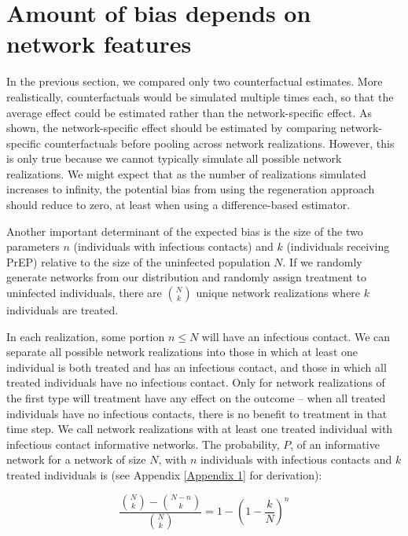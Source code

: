 \documentclass{article}
\theoremstyle{definition}
\begin{document}
\section{Amount of bias depends on network features}
In the previous section, we compared only two counterfactual estimates. More realistically, counterfactuals would be simulated multiple times each, so that the average effect could be estimated rather than the network-specific effect. As shown, the network-specific effect should be estimated by comparing network-specific counterfactuals before pooling across network realizations. However, this is only true because we cannot typically simulate all possible network realizations. We might expect that as the number of realizations simulated increases to infinity, the potential bias from using the regeneration approach should reduce to zero, at least when using a difference-based estimator.

Another important determinant of the expected bias is the size of the two parameters $n$ (individuals with infectious contacts) and $k$ (individuals receiving PrEP) relative to the size of the uninfected population $N$. If we randomly generate networks from our distribution and randomly assign treatment to uninfected individuals, there are $\binom{N}{k}$ unique network realizations where $k$ individuals are treated. 

In each realization, some portion $n \le N$ will have an infectious contact. We can separate all possible network realizations into those in which at least one individual is both treated and has an infectious contact, and those in which all treated individuals have no infectious contact. Only for network realizations of the first type will treatment have any effect on the outcome -- when all treated individuals have no infectious contacts, there is no benefit to treatment in that time step. We call network realizations with at least one treated individual with infectious contact informative networks. The probability, $P$, of an informative network for a network of size $N$, with $n$ individuals with infectious contacts and $k$ treated individuals is (see Appendix \ref{Appendix 1} for derivation):

\begin{equation}\label{eq:17}
    \frac{{\binom{N}{k}}-{\binom{N-n}{k}}}{{\binom{N}{k}}}=1-\left(1-\frac{k}{N}\right)^{n}
\end{equation}
\end{document}

